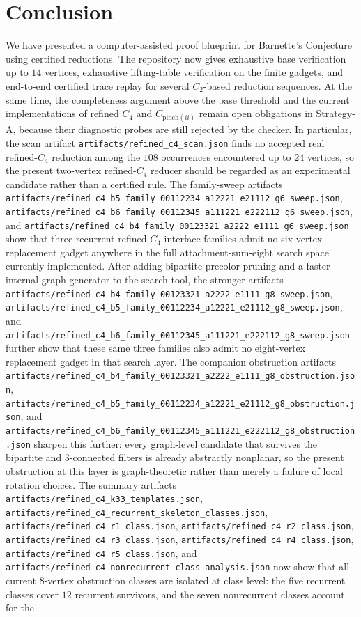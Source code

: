 \documentclass[12pt]{article}
\theoremstyle{definition}
\begin{document}
\section{Conclusion}
\label{sec:conclusion}

We have presented a computer-assisted proof blueprint for Barnette's Conjecture using certified 
reductions. The repository now gives exhaustive base verification up to $14$ vertices, exhaustive lifting-table verification on the finite gadgets, and end-to-end certified trace replay for several $C_2$-based reduction sequences. At the same time, the completeness argument above the base threshold and the current implementations of refined $C_4$ and $C_{\text{pinch}(ii)}$ remain open obligations in Strategy-A, because their diagnostic probes are still rejected by the checker. In particular, the scan artifact \texttt{artifacts/refined\_c4\_scan.json} finds no accepted real refined-$C_4$ reduction among the $108$ occurrences encountered up to $24$ vertices, so the present two-vertex refined-$C_4$ reducer should be regarded as an experimental candidate rather than a certified rule. The family-sweep artifacts \texttt{artifacts/refined\_c4\_b5\_family\_00112234\_a12221\_e21112\_g6\_sweep.json}, \texttt{artifacts/refined\_c4\_b6\_family\_00112345\_a111221\_e222112\_g6\_sweep.json}, and \texttt{artifacts/refined\_c4\_b4\_family\_00123321\_a2222\_e1111\_g6\_sweep.json} show that three recurrent refined-$C_4$ interface families admit no six-vertex replacement gadget anywhere in the full attachment-sum-eight search space currently implemented. After adding bipartite precolor pruning and a faster internal-graph generator to the search tool, the stronger artifacts \texttt{artifacts/refined\_c4\_b4\_family\_00123321\_a2222\_e1111\_g8\_sweep.json}, \texttt{artifacts/refined\_c4\_b5\_family\_00112234\_a12221\_e21112\_g8\_sweep.json}, and \texttt{artifacts/refined\_c4\_b6\_family\_00112345\_a111221\_e222112\_g8\_sweep.json} further show that these same three families also admit no eight-vertex replacement gadget in that search layer. The companion obstruction artifacts \texttt{artifacts/refined\_c4\_b4\_family\_00123321\_a2222\_e1111\_g8\_obstruction.json}, \texttt{artifacts/refined\_c4\_b5\_family\_00112234\_a12221\_e21112\_g8\_obstruction.json}, and \texttt{artifacts/refined\_c4\_b6\_family\_00112345\_a111221\_e222112\_g8\_obstruction.json} sharpen this further: every graph-level candidate that survives the bipartite and $3$-connected filters is already abstractly nonplanar, so the present obstruction at this layer is graph-theoretic rather than merely a failure of local rotation choices. The summary artifacts \texttt{artifacts/refined\_c4\_k33\_templates.json}, \texttt{artifacts/refined\_c4\_recurrent\_skeleton\_classes.json}, \texttt{artifacts/refined\_c4\_r1\_class.json}, \texttt{artifacts/refined\_c4\_r2\_class.json}, \texttt{artifacts/refined\_c4\_r3\_class.json}, \texttt{artifacts/refined\_c4\_r4\_class.json}, \texttt{artifacts/refined\_c4\_r5\_class.json}, and \texttt{artifacts/refined\_c4\_nonrecurrent\_class\_analysis.json} now show that all current $8$-vertex obstruction classes are isolated at class level: the five recurrent classes cover $12$ recurrent survivors, and the seven nonrecurrent classes account for the 
\end{document}

